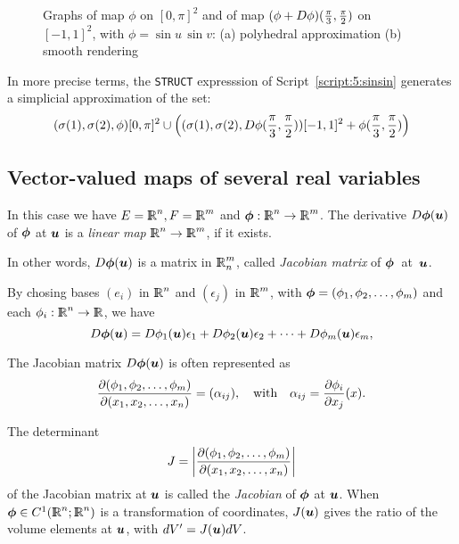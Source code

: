 \documentclass{31x47jw}
\begin{document}
\begin{example}
\begin{figure}[htb]
\centering
{}
\caption{Graphs of map $\phi$ on $[0,\pi]^{2}$ and of map $(\phi +
D\phi)({\pi\over 3},{\pi\over 2})$ on $[-1,1]^{2}$, with  $\phi =
\sin u\, \sin v$: (a) polyhedral approximation (b) smooth rendering
\label{figure:5:ex41}}
\end{figure}

In more precise terms, the \texttt{STRUCT} expresssion of
Script~\ref{script:5:sinsin} generates a simplicial approximation of
the set:
\[
(\sigma(1), \sigma(2), \phi)[0,\pi]^{2} 
\cup \left(
(\sigma(1), \sigma(2), D\phi({\pi\over 3},{\pi\over 2}))[-1,1]^{2}
+\phi({\pi\over 3},{\pi\over 2})
\right)
\]

\end{example} 



\subsection{Vector-valued maps of several real variables}

In this case we have $E = \mathbb{I\!\!R}^{n},F = \mathbb{I\!\!R}^{m}$ and ${\mbox{\boldmath $\phi$}}:\mathbb{I\!\!R}^{n}
\rightarrow \mathbb{I\!\!R}^{m}$.  The derivative $D{\mbox{\boldmath $\phi$}}({\mbox{\boldmath $u$}})$ of ${\mbox{\boldmath $\phi$}}$
at ${\mbox{\boldmath $u$}}$ is a \emph{linear map} $\mathbb{I\!\!R}^{n}\rightarrow\mathbb{I\!\!R}^{m}$, if it
exists.

In other words, $D{\mbox{\boldmath $\phi$}}({\mbox{\boldmath $u$}})$ is a matrix in $\mathbb{I\!\!R}^{m}_{n}$,
called \emph{Jacobian matrix} of ${\mbox{\boldmath $\phi$}}$~at~${\mbox{\boldmath $u$}}$.

By chosing bases $(e_{i})$ in $\mathbb{I\!\!R}^{n}$ and $(\epsilon_{j})$ in
$\mathbb{I\!\!R}^{m}$, with ${\mbox{\boldmath $\phi$}} = (\phi_{1}, \phi_{2}, \ldots, \phi_{m})$ and each
$\phi_{i}: \mathbb{I\!\!R}^{n}\rightarrow\mathbb{I\!\!R}$, we have
\[
D{\mbox{\boldmath $\phi$}}({\mbox{\boldmath $u$}}) = D\phi_{1}({\mbox{\boldmath $u$}})\epsilon_{1} +
D\phi_{2}({\mbox{\boldmath $u$}})\epsilon_{2} + \cdots + D\phi_{m}({\mbox{\boldmath $u$}})\epsilon_{m},
\]

The Jacobian matrix $D{\mbox{\boldmath $\phi$}}({\mbox{\boldmath $u$}})$ is often represented as
\[
{\partial(\phi_{1}, \phi_{2}, \ldots, \phi_{m})
\over\partial(x_{1}, x_{2}, \ldots, x_{n})} = (\alpha_{ij}),
\quad\mbox{with}\quad \alpha_{ij} = 
{\partial \phi_{i}\over \partial x_{j}}(x) .
\]

The determinant
\[
J=\left| {\partial(\phi_{1}, \phi_{2}, \ldots, \phi_{m})
\over\partial(x_{1}, x_{2}, \ldots, x_{n})} \right|
\]
of the Jacobian matrix at ${\mbox{\boldmath $u$}}$ is called the
\emph{Jacobian} of ${\mbox{\boldmath $\phi$}}$ at ${\mbox{\boldmath $u$}}$. When ${\mbox{\boldmath $\phi$}}\in 
C^{1}(\mathbb{I\!\!R}^{n};\mathbb{I\!\!R}^{n})$ is a transformation of coordinates, $J({\mbox{\boldmath $u$}})$ 
gives the ratio of the volume elements at ${\mbox{\boldmath $u$}}$, with $dV' = J({\mbox{\boldmath $u$}}) 
dV$. 
\end{document}
